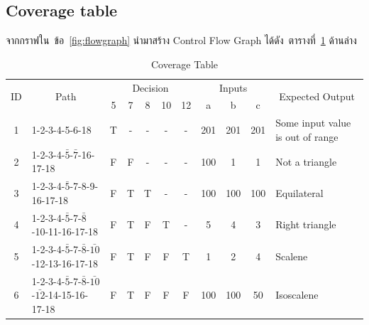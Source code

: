 \documentclass[12pt,a4paper]{article}
\newcommand{\outbound}{Some input value is out of range}
\newcommand{\nottriangle}{Not a triangle}
\newcommand{\equ}{Equilateral}
\newcommand{\sca}{Scalene}
\newcommand{\iso}{Isoscalene}
\newcommand{\numbername}{ข้อ}
\newcommand{\righttri}{Right triangle}
\renewcommand{\tablename}{ตารางที่}
\begin{document}
\newpage
\clearpage
\begin{landscape}
    \section{Coverage table}
    จากกราฟใน~\numbername~\ref{fig:flowgraph} นำมาสร้าง Control Flow Graph ได้ดัง~\tablename~\ref{tab:coveragetable} ด้านล่าง
    \label{sec:coveragetable}
    \begin{table}[hb!]
        \caption{Coverage Table}
        \label{tab:coveragetable}
        \begin{center}
            \begin{tabular}[p]{ | c | l | *{8}{c|} l |}
                \hline
                \multirow{2}{*}{ID} & \multicolumn{1}{c}{\multirow{2}{*}{Path}} & \multicolumn{5}{|c|}{Decision} & \multicolumn{3}{|c|}{Inputs} & \multicolumn{1}{c|}{\multirow{2}{*}{Expected Output}} \\ \cline{3-10}
                                    &                                                   & 5  & 7  & 8  & 10 & 12 & a   & b   & c   &                \\ \hline
                1 & 1-2-3-4-5-6-18                                                      & T  & -  & -  & -  & -  & 201 & 201 & 201 & \outbound      \\ \hline
                2 & 1-2-3-4-$\bar{5}$-$\bar{7}$-16-17-18                                & F  & F  & -  & -  & -  & 100 &   1 &   1 & \nottriangle   \\ \hline
                3 & 1-2-3-4-$\bar{5}$-7-8-9-16-17-18                                    & F  & T  & T  & -  & -  & 100 & 100 & 100 & \equ           \\ \hline
                4 & 1-2-3-4-$\bar{5}$-7-$\bar{8}$-10-11-16-17-18                        & F  & T  & F  & T  & -  &   5 &   4 &   3 & \righttri      \\ \hline
                5 & 1-2-3-4-$\bar{5}$-7-$\bar{8}$-$\bar{10}$-12-13-16-17-18             & F  & T  & F  & F  & T  &   1 &   2 &   4 & \sca           \\ \hline
                6 & 1-2-3-4-$\bar{5}$-7-$\bar{8}$-$\bar{10}$-$\bar{12}$-14-15-16-17-18  & F  & T  & F  & F  & F  & 100 & 100 &  50 & \iso           \\ \hline
            \end{tabular}
        \end{center}
    \end{table}

\end{landscape}
\end{document}
